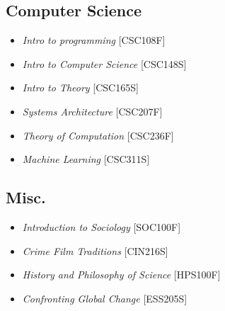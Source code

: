 \documentclass[%
               doublesided,
               paper=a4,
               fontsize=10pt
              ]{resumestyle}
\begin{document}
{        \subsection{Computer Science}
            \begin{itemize}
                \item \textit{Intro to programming} [CSC108F]
                \item \textit{Intro to Computer Science} [CSC148S]
                \item \textit{Intro to Theory} [CSC165S]
                \item \textit{Systems Architecture} [CSC207F]
                \item \textit{Theory of Computation} [CSC236F]
                \item \textit{Machine Learning} [CSC311S]
            \end{itemize}
        
        \subsection{Misc.}
            \begin{itemize}
                \item \textit{Introduction to Sociology} [SOC100F]
                \item \textit{Crime Film Traditions} [CIN216S]
                \item \textit{History and Philosophy of Science} [HPS100F]
                \item \textit{Confronting Global Change} [ESS205S]
            \end{itemize}

            
}
\end{document}
